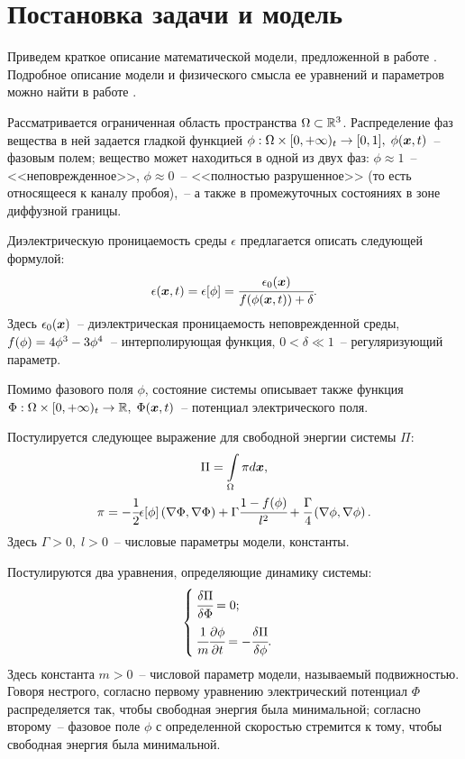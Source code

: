 
\section{Постановка задачи и модель}
\label{sec:problem_and_model}

Приведем краткое описание математической модели, предложенной в работе \cite{pitike_dielectric_breakdown}. Подробное описание модели и физического смысла ее уравнений и параметров можно найти в работе \cite{ponomarev_stability}.

Рассматривается ограниченная область пространства $\Omega \subset {\mathbb{R}}^3$. Распределение фаз вещества в ней задается гладкой функцией $\phi: \Omega \times [0, +\infty)_t \hm \to [0, 1], \; \phi(\vx, t)$~-- фазовым полем; вещество может находиться в одной из двух фаз: $\phi \approx 1$~-- <<неповрежденное>>, $\phi \approx 0$~-- <<полностью разрушенное>> (то есть относящееся к каналу пробоя),~-- а также в промежуточных состояниях в зоне диффузной границы.

Диэлектрическую проницаемость среды $\epsilon$ предлагается описать следующей формулой:
$$\epsilon({\boldsymbol{x}}, t) = \epsilon[\phi] = \cfrac{\epsilon_0({\boldsymbol{x}})}{f(\phi({\boldsymbol{x}}, t)) + \delta} {\text{.}}$$
Здесь $\epsilon_0({\boldsymbol{x}})$~-- диэлектрическая проницаемость неповрежденной среды, $f(\phi) \hm = 4\phi^3 - 3\phi^4$~-- интерполирующая функция, $0 < \delta \ll 1$~-- регуляризующий параметр.

Помимо фазового поля $\phi$, состояние системы описывает также функция $\Phi: \Omega \times [0, +\infty)_t \to {\mathbb{R}}, \; \Phi({\boldsymbol{x}}, t)$~-- потенциал электрического поля.

Постулируется следующее выражение для свободной энергии системы $\Pi$:
\begin{gather*}
	\Pi = \int \limits_\Omega \pi d {\boldsymbol{x}} {\text{,}} \\
	\pi = -\cfrac{1}{2} \epsilon[\phi] \left( \nabla \Phi, \nabla \Phi \right) + \Gamma \cfrac{1 - f(\phi)}{l^2} + \cfrac{\Gamma}{4} \left( \nabla \phi, \nabla \phi \right) {\text{.}}
\end{gather*}
Здесь $\Gamma > 0, \; l > 0$~-- числовые параметры модели, константы.

Постулируются два уравнения, определяющие динамику системы:
\begin{equation*}
\begin{cases}
	\cfrac{\delta \Pi}{\delta \Phi} = 0 {\text{;}} \\[3mm]
	\cfrac{1}{m} \cfrac{\partial \phi}{\partial t} = -\cfrac{\delta \Pi}{\delta \phi} {\text{.}}
\end{cases}
\end{equation*}
Здесь константа $m > 0$~-- числовой параметр модели, называемый подвижностью. Говоря нестрого, согласно первому уравнению электрический потенциал $\Phi$ распределяется так, чтобы свободная энергия была минимальной; согласно второму~-- фазовое поле $\phi$ с определенной скоростью стремится к тому, чтобы свободная энергия была минимальной.

